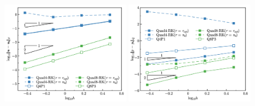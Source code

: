 \begin{figure}[H]
\centering
\begin{subcaptiongroup}
\centering
\parbox[b]{0.49\textwidth}{
    \includegraphics[width=0.49\textwidth]{png/cantilever_Hdev_r1.png}
    \caption{}\label{fg:cantilever_convergence_strain}
}
\parbox[b]{0.49\textwidth}{
    \includegraphics[width=0.49\textwidth]{png/cantilever_L2_p_r1.png}
    \caption{}\label{fg:cantilever_convergence_pressure}
}
\end{subcaptiongroup}
\caption{}\DIFaddendFL \label{fg:cantilever_convergence}
\end{figure}

